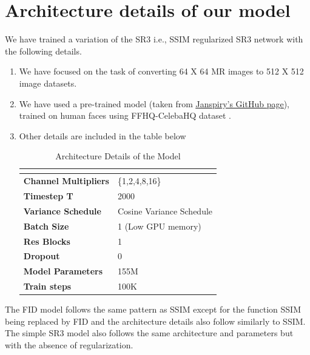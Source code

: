 \section{Architecture details of our model}

We have trained a variation of the SR3 i.e., SSIM regularized SR3 network with the following details.

\begin{enumerate}
    \item We have focused on the task of converting 64 X 64 MR images to 512 X 512 image datasets.
    \item We have used a pre-trained model (taken from \underline{\href{https://github.com/Janspiry/Image-Super-Resolution-via-Iterative-Refinement}{Janspiry's GitHub page}}), trained on human faces using FFHQ-CelebaHQ dataset \cite{karras2018progressive, karras2019stylebased}.
    \item Other details are included in the table below

    \vspace*{0.3cm}
    \begin{table}[h]
    \begin{center}
    \begin{tabular}{ p{6cm} m{6cm}}
     \hline
     \multicolumn{2}{c}{} \\
     \hline
     \textbf{Channel Multipliers}    & \{1,2,4,8,16\} \\
     \textbf{Timestep T}& 2000\\
     \textbf{Variance Schedule}& Cosine Variance Schedule\\
     \textbf{Batch Size}& 1 (Low GPU memory)\\
     \textbf{Res Blocks}& 1\\
     \textbf{Dropout}& 0\\
     \textbf{Model Parameters}& 155M\\
     \textbf{Train steps}& 100K\\
     \hline
    \end{tabular}
    \end{center}
    \caption{Architecture Details of the Model}
    \label{W-Net table}
    \end{table}
    
\end{enumerate}

The FID model follows the same pattern as SSIM except for the function SSIM being replaced by FID and the architecture details also follow similarly to SSIM. The simple SR3 model also follows the same architecture and parameters but with the absence of regularization.


